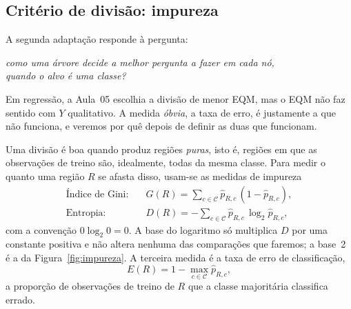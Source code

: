\documentclass[11pt,a4paper]{article}
\begin{document}
\subsection{Critério de divisão: impureza}\label{sec:impureza}
A segunda adaptação responde à pergunta:

\begin{center}\itshape
  como uma árvore decide a melhor pergunta a fazer em cada nó,\\
  quando o alvo é uma classe?
\end{center}

\noindent
Em regressão, a Aula~05 escolhia a divisão de menor EQM, mas o EQM não faz sentido
com $Y$ qualitativo. A medida \emph{óbvia}, a taxa de erro, é justamente a que não
funciona, e veremos por quê depois de definir as duas que funcionam.

Uma divisão é boa quando produz regiões \emph{puras}, isto é, regiões em que as
observações de treino são, idealmente, todas da mesma classe. Para medir o quanto uma
região $R$ se afasta disso, usam-se as medidas de impureza
\begin{align}
  \text{Índice de Gini:}\quad & G(R) = \sum_{c\in\mathcal{C}} \widehat p_{R,c}\,(1-\widehat p_{R,c}),
  \label{eq:gini}\\
  \text{Entropia:}\quad & D(R) = -\sum_{c\in\mathcal{C}} \widehat p_{R,c}\,\log_2 \widehat p_{R,c},
  \label{eq:entropia}
\end{align}
com a convenção $0\log_2 0=0$. A base do logaritmo só multiplica $D$ por uma constante
positiva e não altera nenhuma das comparações que faremos; a base~2 é a da
Figura~\ref{fig:impureza}. A terceira medida é a taxa de erro de classificação,
\[
  E(R)=1-\max_{c\in\mathcal{C}}\widehat p_{R,c},
\]
a proporção de observações de treino de $R$ que a classe majoritária classifica
errado.
\end{document}
